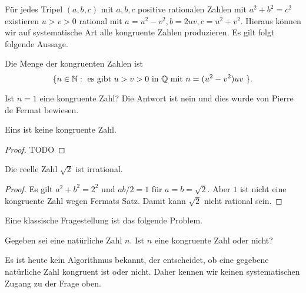 Für jedes Tripel $(a,b,c)$ mit $a,b,c$ positive rationalen Zahlen mit
$a^2+b^2=c^2$ existieren $u>v>0$ rational mit $a =
u^2-v^2,b=2uv,c=u^2+v^2$. Hieraus können wir auf systematische Art
alle kongruente Zahlen produzieren. Es gilt folgt folgende Aussage.

\begin{lemma}
  Die Menge der kongruenten Zahlen ist
  $$
  \{ n \in {\mathbb{N}} : \text{ es gibt $u>v>0$ in ${\mathbb{Q}}$ mit $n=(u^2-v^2)uv$ }
  \}.
  $$
\end{lemma}


Ist $n=1$ eine kongruente Zahl? Die Antwort ist nein und dies wurde
von Pierre de Fermat bewiesen.

\begin{satz}[Fermat]
  \label{satz:fermat}
  Eins  ist keine kongruente Zahl.
\end{satz}
\begin{proof}
  TODO
\end{proof}

\begin{korollar}
  Die reelle Zahl $\sqrt{2}$ ist irrational. 
\end{korollar}
\begin{proof}
  Es gilt $a^2+b^2=2^2$ und $ab/2=1$ für $a=b=\sqrt 2$. Aber $1$ ist
  nicht eine kongruente Zahl wegen Fermats Satz. Damit kann $\sqrt 2$
  nicht rational sein.
\end{proof}

Eine klassische Fragestellung ist das folgende Problem.

\begin{problem}
  Gegeben sei eine natürliche Zahl $n$. Ist $n$ eine kongruente Zahl oder
  nicht? 
\end{problem}

Es ist heute kein Algorithmus bekannt, der entscheidet, ob eine
gegebene natürliche Zahl kongruent ist oder nicht. Daher kennen wir
keinen systematischen Zugang zu der Frage oben.


